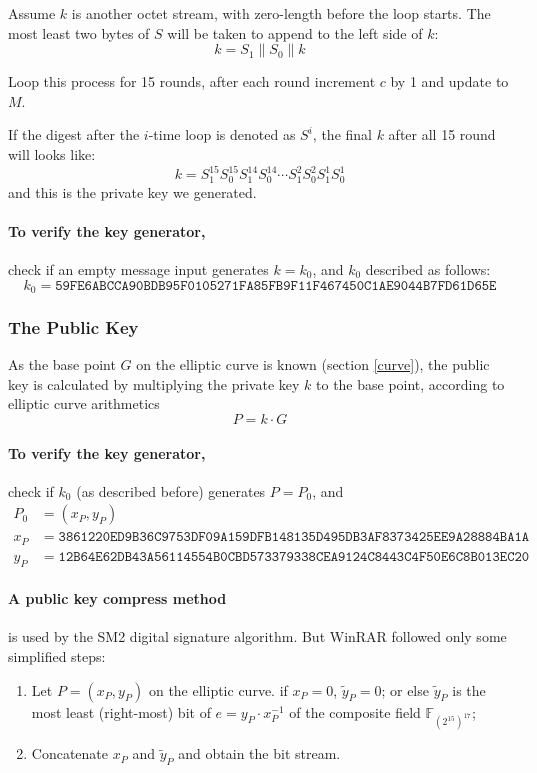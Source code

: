\documentclass[oneside]{article}
\begin{document}
Assume $k$ is another octet stream, with zero-length before the loop starts.
The most least two bytes of $S$ will be taken to append to the left side of $k$:
\[k=S_1\parallel S_0\parallel k\]

Loop this process for 15 rounds, after each round increment $c$ by 1 and update to $M$.

If the digest after the $i$-time loop is denoted as $S^i$, the final $k$ after all 15 round will looks like:
\[k=S^{15}_1S^{15}_0S^{14}_1S^{14}_0\cdots S^2_1S^2_0S^1_1S^1_0\]
and this is the private key we generated.

\paragraph{To verify the key generator,} check if an empty message input generates $k=k_0$, and $k_0$ described as follows:
\[k_0=\mathtt{59FE6ABCCA90BDB95F0105271FA85FB9F11F467450C1AE9044B7FD61D65E}\]

\subsubsection{The Public Key}
As the base point $G$ on the elliptic curve is known (section \ref{curve}), the public key is calculated by multiplying the private key $k$ to the base point, according to elliptic curve arithmetics
\[P=k\cdot G\]

\paragraph{To verify the key generator,} check if $k_0$ (as described before) generates $P=P_0$, and
\begin{align*}
      P_0 & =(x_P,y_P)                                                                 \\
      x_P & =\mathtt{3861220ED9B36C9753DF09A159DFB148135D495DB3AF8373425EE9A28884BA1A} \\
      y_P & =\mathtt{12B64E62DB43A56114554B0CBD573379338CEA9124C8443C4F50E6C8B013EC20}
\end{align*}

\paragraph{A public key compress method} is used by the SM2 digital signature algorithm.
But WinRAR followed only some simplified steps:
\begin{enumerate}
      \item Let $P=\left(x_P,y_P\right)$ on the elliptic curve. if $x_P=0$, $\tilde{y}_P=0$; or else $\tilde{y}_P$ is the most least (right-most) bit of $e=y_P\cdot x_P^{-1}$ of the composite field $\mathbb{F}_{\left(2^{15}\right)^{17}}$;
      \item Concatenate $x_P$ and $\tilde{y}_P$ and obtain the bit stream.
\end{enumerate}
\end{document}
